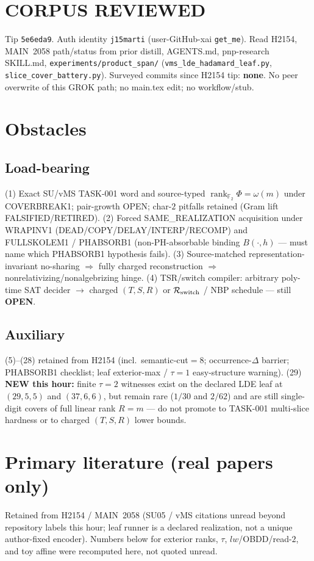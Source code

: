 \documentclass[11pt]{article}
\begin{document}
\section*{CORPUS REVIEWED}
Tip \texttt{5e6eda9}. Auth identity \texttt{j15marti} (user-GitHub-xai \texttt{get\_me}).
Read H2154, MAIN~2058 path/status from prior distill, AGENTS.md, pnp-research SKILL.md,
\texttt{experiments/product\_span/} (\texttt{vms\_lde\_hadamard\_leaf.py},
\texttt{slice\_cover\_battery.py}).
Surveyed commits since H2154 tip: \textbf{none}.
No peer overwrite of this GROK path; no main.tex edit; no workflow/stub.

\section*{Obstacles}
\subsection*{Load-bearing}
(1) Exact SU/vMS TASK-001 word and source-typed
$\operatorname{rank}_{\mathbb F_2}\Phi=\omega(m)$ under COVERBREAK1; pair-growth OPEN;
char-$2$ pitfalls retained (Gram lift FALSIFIED/RETIRED).
(2) Forced SAME\_REALIZATION acquisition under WRAPINV1
(DEAD/COPY/DELAY/INTERP/RECOMP) and FULLSKOLEM1 / PHABSORB1
(non-PH-absorbable binding $B(\cdot,h)$ --- must name which PHABSORB1 hypothesis fails).
(3) Source-matched representation-invariant no-sharing $\Rightarrow$ fully charged reconstruction
$\Rightarrow$ nonrelativizing/nonalgebrizing hinge.
(4) TSR/switch compiler: arbitrary poly-time SAT decider $\to$ charged $(T,S,R)$ or
$\mathcal R_{\rm switch}$ / NBP schedule --- still \textbf{OPEN}.

\subsection*{Auxiliary}
(5)--(28) retained from H2154 (incl.\ semantic-cut$=8$; occurrence-$\Delta$ barrier;
PHABSORB1 checklist; leaf exterior-max / $\tau{=}1$ easy-structure warning).
(29) \textbf{NEW this hour:} finite $\tau{=}2$ witnesses exist on the declared LDE leaf at
$(29,5,5)$ and $(37,6,6)$, but remain rare ($1/30$ and $2/62$) and are still
single-digit covers of full linear rank $R{=}m$ --- do not promote to TASK-001
multi-slice hardness or to charged $(T,S,R)$ lower bounds.

\section*{Primary literature (real papers only)}
Retained from H2154 / MAIN~2058 (SU05 / vMS citations unread beyond repository labels this hour;
leaf runner is a declared realization, not a unique author-fixed encoder).
Numbers below for exterior ranks, $\tau$, $lw$/OBDD/read-$2$, and toy affine
were recomputed here, not quoted unread.
\end{document}
